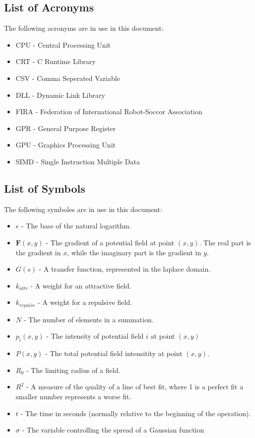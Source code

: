 \subsection*{List of Acronyms}

The following acronyms are in use in this document:

\begin{itemize}
  \item CPU - Central Processing Unit
  \item CRT - C Runtime Library
  \item CSV - Comma Seperated Variable
  \item DLL - Dynamic Link Library
  \item FIRA - Federation of International Robot-Soccor Association
  \item GPR - General Purpose Register
  \item GPU - Graphics Processing Unit
  \item SIMD - Single Instruction Multiple Data
\end{itemize}

\subsection*{List of Symbols}

The following symboles are in use in this document:

\begin{itemize}
  \item $e$ - The base of the natural logarithm.
  \item $\boldsymbol{F}(x,y)$ - The gradient of a potential field at point
  $\left(x,y\right)$.  The real part is the gradient in $x$, while the imaginary
  part is the gradient in $y$.
  \item $G(s)$ - A transfer function, represented in the laplace domain.
  \item $k_{attr}$ - A weight for an attractive field.
  \item $k_{repulse}$ - A weight for a repulsive field.
  \item $N$ - The number of elements in a summation.
  \item $p_i(x,y)$ - The intensity of potential field $i$ at point
  $\left(x,y\right)$
  \item $P(x,y)$ - The total potential field intensitity at point
  $\left(x,y\right)$.
  \item $R_0$ - The limiting radius of a field.
  \item $R^2$ - A measure of the quality of a line of best fit, where 1 is a
  perfect fit a smaller number represents a worse fit.
  \item $t$ - The time in seconds (normally relative to the beginning of the
  operation).
  \item $\sigma$ - The variable controlling the spread of a Gaussian function
\end{itemize}

\cleardoublepage

